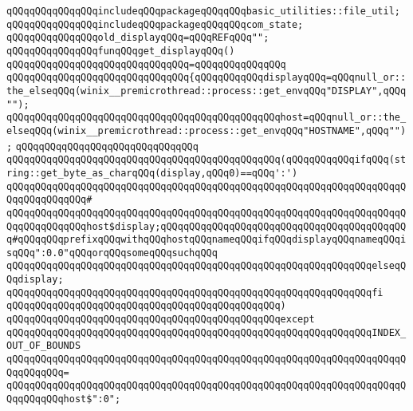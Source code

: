 \verb|qQQqqQQqqQQqqQQqincludeqQQqpackageqQQqqQQqbasic_utilities::file_util;|\newline
\verb|qQQqqQQqqQQqqQQqincludeqQQqpackageqQQqqQQqcom_state;|\newline
\newline
\verb|qQQqqQQqqQQqqQQqold_displayqQQq=qQQqREFqQQq"";|\newline
\newline
\verb|qQQqqQQqqQQqqQQqfunqQQqget_displayqQQq()|\newline
\verb|qQQqqQQqqQQqqQQqqQQqqQQqqQQqqQQq=qQQqqQQqqQQqqQQq|\newline
\verb|qQQqqQQqqQQqqQQqqQQqqQQqqQQqqQQq{qQQqqQQqqQQqdisplayqQQq=qQQqnull_or::the_elseqQQq(winix__premicrothread::process::get_envqQQq"DISPLAY",qQQq"");|\newline
\verb|qQQqqQQqqQQqqQQqqQQqqQQqqQQqqQQqqQQqqQQqqQQqqQQqhost=qQQqnull_or::the_elseqQQq(winix__premicrothread::process::get_envqQQq"HOSTNAME",qQQq"");|\newline
\verb|qQQqqQQqqQQqqQQqqQQqqQQqqQQqqQQq|\newline
\verb|qQQqqQQqqQQqqQQqqQQqqQQqqQQqqQQqqQQqqQQqqQQqqQQq(qQQqqQQqqQQqifqQQq(string::get_byte_as_charqQQq(display,qQQq0)==qQQq':')|\newline
\verb|qQQqqQQqqQQqqQQqqQQqqQQqqQQqqQQqqQQqqQQqqQQqqQQqqQQqqQQqqQQqqQQqqQQqqQQqqQQqqQQqqQQq#|\newline
\verb|qQQqqQQqqQQqqQQqqQQqqQQqqQQqqQQqqQQqqQQqqQQqqQQqqQQqqQQqqQQqqQQqqQQqqQQqqQQqqQQqqQQqhost$display;qQQqqQQqqQQqqQQqqQQqqQQqqQQqqQQqqQQqqQQqqQQq#qQQqqQQqprefixqQQqwithqQQqhostqQQqnameqQQqifqQQqdisplayqQQqnameqQQqisqQQq":0.0"qQQqorqQQqsomeqQQqsuchqQQq|\newline
\verb|qQQqqQQqqQQqqQQqqQQqqQQqqQQqqQQqqQQqqQQqqQQqqQQqqQQqqQQqqQQqqQQqelseqQQqdisplay;|\newline
\verb|qQQqqQQqqQQqqQQqqQQqqQQqqQQqqQQqqQQqqQQqqQQqqQQqqQQqqQQqqQQqqQQqfi|\newline
\verb|qQQqqQQqqQQqqQQqqQQqqQQqqQQqqQQqqQQqqQQqqQQqqQQq)|\newline
\verb|qQQqqQQqqQQqqQQqqQQqqQQqqQQqqQQqqQQqqQQqqQQqqQQqexcept|\newline
\verb|qQQqqQQqqQQqqQQqqQQqqQQqqQQqqQQqqQQqqQQqqQQqqQQqqQQqqQQqqQQqqQQqINDEX_OUT_OF_BOUNDS|\newline
\verb|qQQqqQQqqQQqqQQqqQQqqQQqqQQqqQQqqQQqqQQqqQQqqQQqqQQqqQQqqQQqqQQqqQQqqQQqqQQqqQQq=|\newline
\verb|qQQqqQQqqQQqqQQqqQQqqQQqqQQqqQQqqQQqqQQqqQQqqQQqqQQqqQQqqQQqqQQqqQQqqQQqqQQqqQQqhost$":0";|\newline
